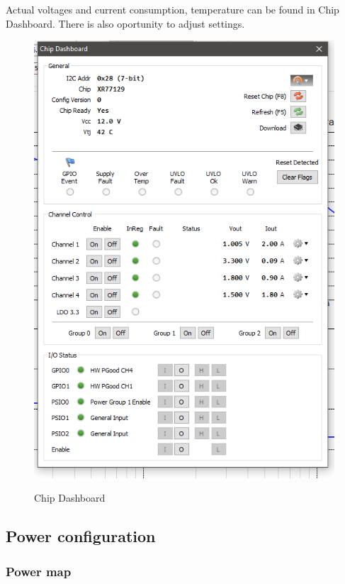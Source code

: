 Actual voltages and current consumption, temperature can be found in Chip Dashboard. There is also oportunity to adjust settings.

\begin{figure}[htbp!]
	\centering
	\includegraphics[scale=0.6]{img/exarprog.png}\\
	\caption{Chip Dashboard} 
\end{figure}

\clearpage
\subsection{Power configuration} 

\subsubsection{Power map}


